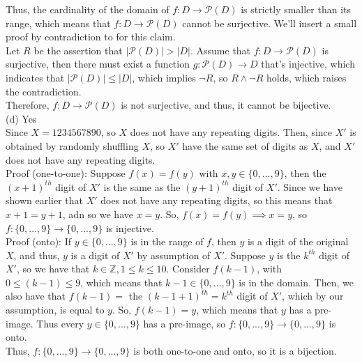 \documentclass{article}
\begin{document}
Thus, the cardinality of the domain of $f:D\rightarrow\mathscr{P}(D)$ is strictly smaller than its range, which means that $f:D\rightarrow\mathscr{P}(D)$ cannot be surjective. We'll insert a small proof by contradiction to for this claim. \\

Let $R$ be the assertion that $|\mathscr{P}(D)| > |D|$. Assume that $f:D\rightarrow\mathscr{P}(D)$ is surjective, then there must exist a function $g:\mathscr{P}(D)\rightarrow D$ that's injective, which indicates that $|\mathscr{P}(D)| \leq |D|$, which implies $\neg R$, so $R\land\neg R$ holds, which raises the contradiction. \\

Therefore, $f:D\rightarrow\mathscr{P}(D)$ is not surjective,
and thus, it cannot be bijective. \\[.5cm]
(d) {\color{red} Yes} \\[.3cm]
\indent Since $X = 1234567890$, so $X$ does not have any repeating digits. Then, since $X'$ is obtained by randomly shuffling $X$, so $X'$ have the same set of digits as $X$, and $X'$ does not have any repeating digits. \\

Proof (one-to-one): Suppose $f(x) = f(y)$ with $x, y\in\{0,...,9\}$, then the $(x+1)^{th}$ digit of $X'$ is the same as the $(y+1)^{th}$ digit of $X'$. Since we have shown earlier that $X'$ does not have any repeating digits, so this means that $x+1 = y+1$, adn so we have $x = y$. So, $f(x) = f(y)\implies x = y$, so $f:\{0,...,9\}\rightarrow\{0,...,9\}$ is injective. \\

Proof (onto): If $y\in\{0,...,9\}$ is in the range of $f$, then $y$ is a digit of the original $X$, and thus, $y$ is a digit of $X'$ by assumption of $X'$. Suppose $y$ is the $k^{th}$ digit of $X'$, so we have that $k\in\mathbb{Z}, 1\leq k\leq 10$. Consider $f(k-1)$, with $0\leq(k-1)\leq9$, which means that $k-1\in\{0,...,9\}$ is in the domain. Then, we also have that $f(k-1) = $ the $(k-1+1)^{th} = k^{th}$ digit of $X'$, which by our assumption, is equal to $y$. So, $f(k-1) = y$, which means that $y$ has a pre-image. Thus every $y\in\{0,...,9\}$ has a pre-image, so $f:\{0,...,9\}\rightarrow\{0,...,9\}$ is onto. \\

\indent Thus, $f:\{0,...,9\}\rightarrow\{0,...,9\}$ is both one-to-one and onto, so it is a bijection. \\[.3cm]
\end{document}
